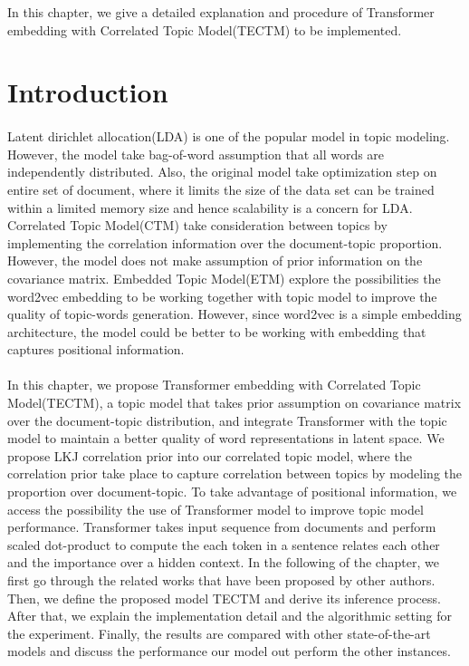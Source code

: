 In this chapter, we give a detailed explanation and procedure of Transformer embedding with Correlated Topic Model(TECTM) to be implemented.
\section{Introduction}
\paragraph{}Latent dirichlet allocation(LDA)\cite{blei_latent_2003} is one of the popular model in topic modeling. However, the model take bag-of-word assumption that all words are independently distributed. Also, the original model take optimization step on entire set of document, where it limits the size of the data set can be trained within a limited memory size and hence scalability is a concern for LDA.
Correlated Topic Model(CTM)\cite{blei_correlated_2007} take consideration between topics by implementing the correlation information over the document-topic proportion. However, the model does not make assumption of prior information on the covariance matrix.
Embedded Topic Model(ETM)\cite{dieng_topic_2019} explore the possibilities the word2vec embedding to be working together with topic model to improve the quality of topic-words generation. However, since word2vec is a simple embedding architecture, the model could be better to be working with embedding that captures positional information.
\paragraph{}In this chapter, we propose Transformer embedding with Correlated Topic Model(TECTM), a topic model that takes prior assumption on covariance matrix over the document-topic distribution, and integrate Transformer with the topic model to maintain a better quality of word representations in latent space.
We propose LKJ correlation prior into our correlated topic model, where the correlation prior take place to capture correlation between topics by modeling the proportion over document-topic.
To take advantage of positional information, we access the possibility the use of Transformer model to improve topic model performance. Transformer takes input sequence from documents and perform scaled dot-product to compute the each token in a sentence relates each other and the importance over a hidden context.
In the following of the chapter, we first go through the related works that have been proposed by other authors. Then, we define the proposed model TECTM and derive its inference process. After that, we explain the implementation detail and the algorithmic setting for the experiment. Finally, the results are compared with other state-of-the-art models and discuss the performance our model out perform the other instances.
